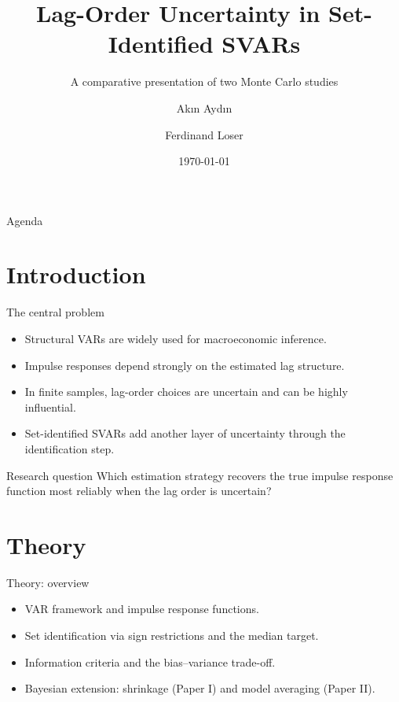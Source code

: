\documentclass[aspectratio=169]{beamer}
\title[Lag-Order Uncertainty in Set-Identified SVARs]{Lag-Order Uncertainty in Set-Identified SVARs}
\subtitle{A comparative presentation of two Monte Carlo studies}
\author[Ak\i n Ayd\i n \& Ferdinand Loser]{Ak\i n Ayd\i n \and Ferdinand Loser}
\institute{Ludwig-Maximilian University of Munich}
\date{\today}
\begin{document}
\begin{frame}
  \titlepage
\end{frame}

\begin{frame}{Agenda}
  \tableofcontents[subsectionstyle=show/show/show]
\end{frame}


\section{Introduction}

\begin{frame}{The central problem}
  \begin{itemize}
    \item Structural VARs are widely used for macroeconomic inference.
    \item Impulse responses depend strongly on the estimated lag structure.
    \item In finite samples, lag-order choices are uncertain and can be highly influential.
    \item Set-identified SVARs add another layer of uncertainty through the identification step.
  \end{itemize}
  \vspace{0.4cm}
  \begin{block}{Research question}
    Which estimation strategy recovers the true impulse response function most reliably when the lag order is uncertain?
  \end{block}
\end{frame}

\section{Theory}

\begin{frame}{Theory: overview}
  \begin{itemize}
    \item VAR framework and impulse response functions.
    \item Set identification via sign restrictions and the median target.
    \item Information criteria and the bias--variance trade-off.
    \item Bayesian extension: shrinkage (Paper I) and model averaging (Paper II).
  \end{itemize}
\end{frame}
\end{document}
